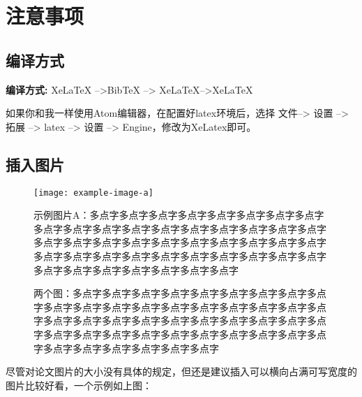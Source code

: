 \documentclass[AutoFakeBold]{LZUThesis-PgD&PhD}
\begin{document}
\mainmatter

\chapter{注意事项}

\section{编译方式}

 {\bfseries 编译方式:} XeLaTeX -->BibTeX --> XeLaTeX-->XeLaTeX

如果你和我一样使用Atom编辑器，在配置好latex环境后，选择 文件--> 设置 --> 拓展 --> latex --> 设置 --> Engine，修改为XeLatex即可。

\section{插入图片}

\begin{figure}[hbt!]
  \texttt{[image: example-image-a]}
  \centering
  \caption{示例图片A：多点字多点字多点字多点字多点字多点字多点字多点字多点字多点字多点字多点字多点字多点字多点字多点字多点字多点字多点字多点字多点字多点字多点字多点字多点字多点字多点字多点字多点字多点字多点字多点字多点字多点字多点字多点字多点字多点字多点字多点字多点字多点字多点字多点字多点字}
  \label{fig:obj_dect}
\end{figure}


\begin{figure}[H]
  \centering
  \caption{两个图：多点字多点字多点字多点字多点字多点字多点字多点字多点字多点字多点字多点字多点字多点字多点字多点字多点字多点字多点字多点字多点字多点字多点字多点字多点字多点字多点字多点字多点字多点字多点字多点字多点字多点字多点字多点字多点字多点字多点字多点字多点字多点字多点字多点字多点字}
  \label{fig_ldr}
\end{figure}

尽管对论文图片的大小没有具体的规定，但还是建议插入可以横向占满可写宽度的图片比较好看，一个示例如上图：

\end{document}
